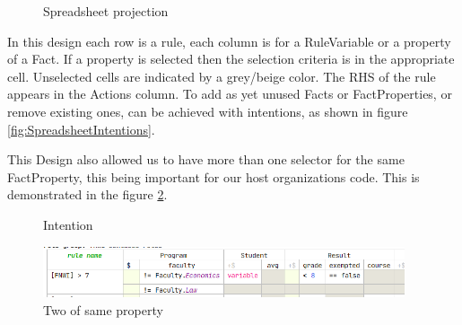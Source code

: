 \begin{figure}[h]
    \centering
    \caption{Spreadsheet projection}
    \label{fig:SpreadsheetProjection}
\end{figure}

In this design each row is a rule, each column is for a RuleVariable or a property of a Fact.
If a property is selected then the selection criteria is in the appropriate cell.
Unselected cells are indicated by a grey/beige color.
The RHS of the rule appears in the Actions column.
To add as yet unused Facts or FactProperties, or remove existing ones, can be achieved with intentions, as shown in figure \ref{fig:SpreadsheetIntentions}.

This Design also allowed us to have more than one selector for the same FactProperty, this being important for our host organizations code.
This is demonstrated in the figure \ref{fig:TwoProperties}.

\begin{figure}
    \centering
    \begin{minipage}{0.35\textwidth}
        \centering
        \caption{Intention}
        \label{fig:SpreadsheetIntentions}
    \end{minipage}\hfill
    \begin{minipage}{0.65\textwidth}
        \centering
        \includegraphics[width=0.95\textwidth]{Sections/images/spreadsheetTwoProperties.png} 
        \caption{Two of same property}
        \label{fig:TwoProperties}
    \end{minipage}
\end{figure}

